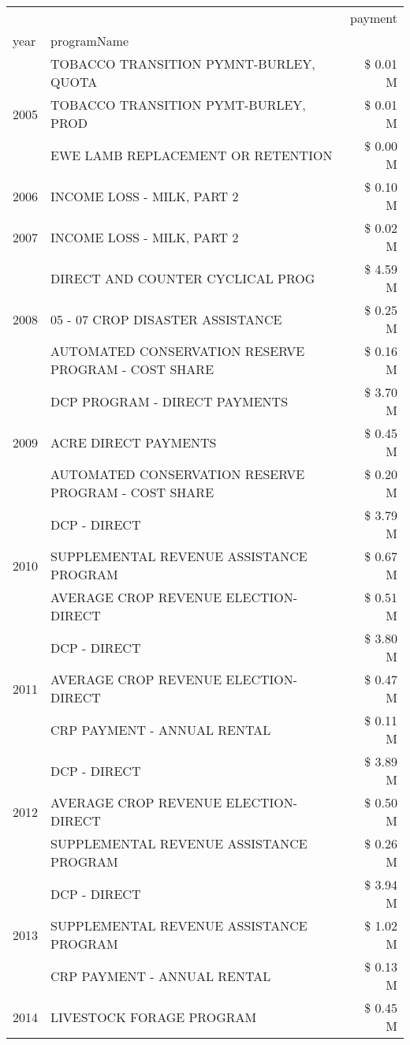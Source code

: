 \begin{tabular}{llr}
\toprule
 &  & payment \\
year & programName &  \\
\midrule
\multirow[t]{3}{*}{2005} & TOBACCO TRANSITION PYMNT-BURLEY, QUOTA & \$ 0.01 M \\
 & TOBACCO TRANSITION PYMT-BURLEY, PROD & \$ 0.01 M \\
 & EWE LAMB REPLACEMENT OR RETENTION & \$ 0.00 M \\
\cline{1-3}
2006 & INCOME LOSS - MILK, PART 2 & \$ 0.10 M \\
\cline{1-3}
2007 & INCOME LOSS - MILK, PART 2 & \$ 0.02 M \\
\cline{1-3}
\multirow[t]{3}{*}{2008} & DIRECT AND COUNTER CYCLICAL PROG & \$ 4.59 M \\
 & 05 - 07 CROP DISASTER ASSISTANCE & \$ 0.25 M \\
 & AUTOMATED CONSERVATION RESERVE PROGRAM - COST SHARE & \$ 0.16 M \\
\cline{1-3}
\multirow[t]{3}{*}{2009} & DCP PROGRAM - DIRECT PAYMENTS & \$ 3.70 M \\
 & ACRE DIRECT PAYMENTS & \$ 0.45 M \\
 & AUTOMATED CONSERVATION RESERVE PROGRAM - COST SHARE & \$ 0.20 M \\
\cline{1-3}
\multirow[t]{3}{*}{2010} & DCP - DIRECT & \$ 3.79 M \\
 & SUPPLEMENTAL REVENUE ASSISTANCE PROGRAM & \$ 0.67 M \\
 & AVERAGE CROP REVENUE ELECTION-DIRECT & \$ 0.51 M \\
\cline{1-3}
\multirow[t]{3}{*}{2011} & DCP - DIRECT & \$ 3.80 M \\
 & AVERAGE CROP REVENUE ELECTION-DIRECT & \$ 0.47 M \\
 & CRP PAYMENT - ANNUAL RENTAL & \$ 0.11 M \\
\cline{1-3}
\multirow[t]{3}{*}{2012} & DCP - DIRECT & \$ 3.89 M \\
 & AVERAGE CROP REVENUE ELECTION-DIRECT & \$ 0.50 M \\
 & SUPPLEMENTAL REVENUE ASSISTANCE PROGRAM & \$ 0.26 M \\
\cline{1-3}
\multirow[t]{3}{*}{2013} & DCP - DIRECT & \$ 3.94 M \\
 & SUPPLEMENTAL REVENUE ASSISTANCE PROGRAM & \$ 1.02 M \\
 & CRP PAYMENT - ANNUAL RENTAL & \$ 0.13 M \\
\cline{1-3}
\multirow[t]{3}{*}{2014} & LIVESTOCK FORAGE PROGRAM & \$ 0.45 M \\

\end{tabular}
